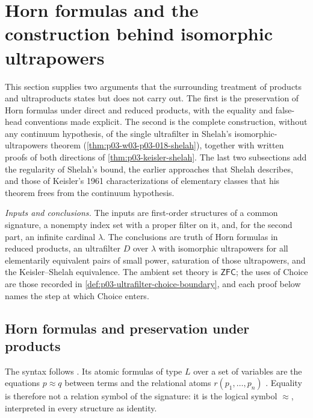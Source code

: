 \section{Horn formulas and the construction behind isomorphic ultrapowers}
\label{sec:p03-w03-p03-017}

This section supplies two arguments that the surrounding treatment of
products and ultraproducts states but does not carry out.  The first is the
preservation of Horn formulas under direct and reduced products, with the
equality and false-head conventions made explicit.  The second is the
complete construction, without any continuum hypothesis, of the single
ultrafilter in Shelah's isomorphic-ultrapowers theorem
(\cref{thm:p03-w03-p03-018-shelah}), together with written proofs of both
directions of \cref{thm:p03-keisler-shelah}.  The last two subsections add
the regularity of Shelah's bound, the earlier approaches that Shelah
describes, and those of Keisler's 1961 characterizations of elementary
classes that his theorem frees from the continuum hypothesis.

\emph{Inputs and conclusions.}  The inputs are first-order structures of a
common signature, a nonempty index set with a proper filter on it, and, for
the second part, an infinite cardinal \(\lambda\).  The conclusions are
truth of Horn formulas in reduced products, an ultrafilter \(D\) over
\(\lambda\) with isomorphic ultrapowers for all elementarily equivalent pairs
of small power, saturation of those ultrapowers, and the Keisler--Shelah
equivalence.  The ambient set theory is \(\mathsf{ZFC}\); the uses of Choice
are those recorded in \cref{def:p03-ultrafilter-choice-boundary}, and each
proof below names the step at which Choice enters.

\subsection{Horn formulas and preservation under products}
\label{sec:p03-w03-p03-017-horn}

The syntax follows \textcite{BurrisSankappanavar2012}.  Its atomic formulas
of type \(L\) over a set of variables are the equations \(p\approx q\)
between terms and the relational atoms \(r(p_1,\ldots,p_n)\)
\cite[V\S1, Definition~1.4, p.~192]{BurrisSankappanavar2012}.  Equality is
therefore not a relation symbol of the signature: it is the logical symbol
\(\approx\), interpreted in every structure as identity.

